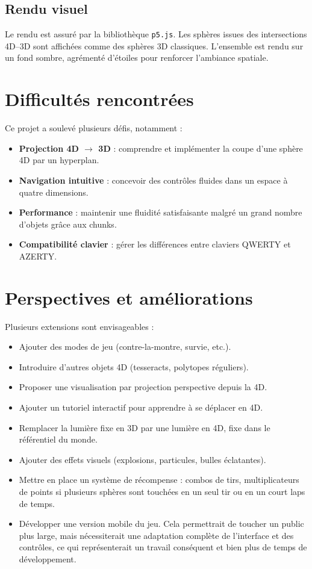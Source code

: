 \documentclass[11pt,a4paper]{article}
\begin{document}
\subsection{Rendu visuel}

Le rendu est assuré par la bibliothèque \texttt{p5.js}. Les sphères issues des intersections 4D–3D sont affichées comme des sphères 3D classiques. L’ensemble est rendu sur un fond sombre, agrémenté d’étoiles pour renforcer l’ambiance spatiale.

\section{Difficultés rencontrées}

Ce projet a soulevé plusieurs défis, notamment :
\begin{itemize}
	\item \textbf{Projection 4D $\rightarrow$ 3D} : comprendre et implémenter la coupe d’une sphère 4D par un hyperplan.
	\item \textbf{Navigation intuitive} : concevoir des contrôles fluides dans un espace à quatre dimensions.
	\item \textbf{Performance} : maintenir une fluidité satisfaisante malgré un grand nombre d’objets grâce aux chunks.
	\item \textbf{Compatibilité clavier} : gérer les différences entre claviers QWERTY et AZERTY.
\end{itemize}

\section{Perspectives et améliorations}

Plusieurs extensions sont envisageables :
\begin{itemize}
    \item Ajouter des modes de jeu (contre-la-montre, survie, etc.).
    \item Introduire d’autres objets 4D (tesseracts, polytopes réguliers).
    \item Proposer une visualisation par projection perspective depuis la 4D.
    \item Ajouter un tutoriel interactif pour apprendre à se déplacer en 4D.
    \item Remplacer la lumière fixe en 3D par une lumière en 4D, fixe dans le référentiel du monde.
    \item Ajouter des effets visuels (explosions, particules, bulles éclatantes).
    \item Mettre en place un système de récompense : combos de tirs, multiplicateurs de points si plusieurs sphères sont touchées en un seul tir ou en un court laps de temps.
    \item Développer une version mobile du jeu. Cela permettrait de toucher un public plus large, mais nécessiterait une adaptation complète de l’interface et des contrôles, ce qui représenterait un travail conséquent et bien plus de temps de développement.
\end{itemize}
\end{document}
